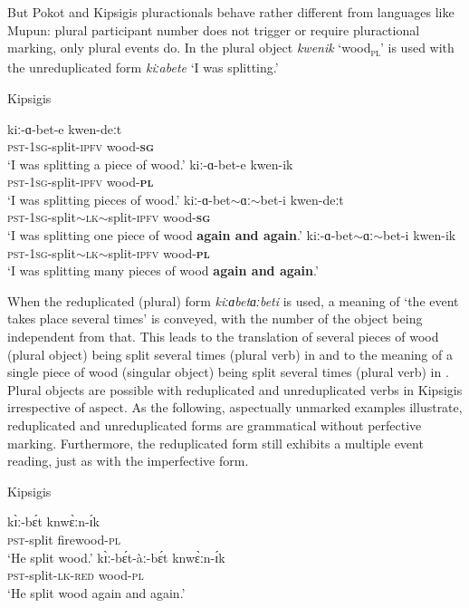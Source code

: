 \documentclass[output=paper,colorlinks,citecolor=brown
]{langscibook}
\begin{document}
But Pokot and Kipsigis pluractionals behave rather different from languages like Mupun: plural participant number does not trigger or require pluractional marking, only plural events do. 
In  the plural object \textit{kwenik} `wood\textsubscript{\textsc{pl}}' is used with the unreduplicated form \textit{kiːabete} `I was splitting.' 

\ea Kipsigis 
\begin{xlist}
\ex 
\gll kiː-ɑ-bet-e kwen-deːt\\
\textsc{pst-1sg}-split-\textsc{ipfv} wood-\textsc{\textbf{sg}}\\
\glt `I was splitting a piece of wood.'
\ex \label{ex:fiebig:KipPl.OBJ}
\gll kiː-ɑ-bet-e kwen-ik\\
\textsc{pst-1sg}-split-\textsc{ipfv} wood-\textsc{\textbf{pl}}\\
\glt `I was splitting pieces of wood.' 
\ex \label{ex:fiebig:KipPLSG}
\gll kiː-ɑ-bet$\sim$ɑː$\sim$bet-i kwen-deːt\\
\textsc{pst-1sg}-split$\sim$\textsc{lk}$\sim$split\textsc{-ipfv} wood-\textsc{\textbf{sg}}\\
\glt `I was splitting one piece of wood \textbf{again and again}.' 
\ex \label{ex:fiebig:KipPLPL}
\gll kiː-ɑ-bet$\sim$ɑː$\sim$bet-i kwen-ik\\
\textsc{pst-1sg}-split$\sim$\textsc{lk}$\sim$split-\textsc{ipfv} wood-\textsc{\textbf{pl}}\\
\glt `I was splitting many pieces of wood \textbf{again and again}.’ 
\end{xlist}
\z

\noindent When the reduplicated (plural) form \textit{kiːɑbetɑːbeti} is used, a meaning of `the event takes place several times' is conveyed, with the number of the object being independent from that. This leads to the translation of several pieces of wood (plural object) being split several times (plural verb) in  and to the meaning of a single piece of wood (singular object) being split several times (plural verb) in . Plural objects are possible with reduplicated and unreduplicated verbs in Kipsigis irrespective of aspect. As the following, aspectually unmarked examples illustrate, reduplicated and unreduplicated forms are grammatical without perfective marking. Furthermore, the reduplicated form still exhibits a multiple event reading, just as with the imperfective form.

\ea Kipsigis
\begin{xlist}
\ex 
\gll kɪ̀ː-bɛ́t knwɛ̀ːn-ɪ́k\\
\textsc{pst}-split firewood-\textsc{pl}\\
\glt `He split wood.'
\ex 
\gll kɪ̀ː-bɛ́t-àː-bɛ́t knwɛ̀ːn-ɪ́k\\
\textsc{pst}-split-\textsc{lk-red} wood-\textsc{pl}\\
\glt `He split wood again and again.'
\end{xlist}
\z
\end{document}
